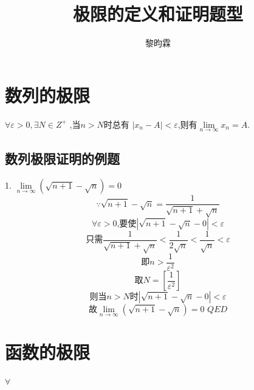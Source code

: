 \documentclass[cn,hazy,blue,14pt,screen]{elegantnote}
\title{极限的定义和证明题型}
\author{黎昀霖}
\begin{document}
\maketitle

\section{数列的极限}

$\forall \varepsilon>0, \exists N\in Z^{+}$ ,当$n>N$时总有 $| x_{n} - A |< \varepsilon$,则有$\lim\limits_{n \to \infty} x_n = A$.

\subsection{数列极限证明的例题}
1. $ \lim\limits_{n \to \infty} (\sqrt{n+1}-\sqrt{n}) =0 $
$$ \because \sqrt{n+1} - \sqrt{n} = \frac{1}{\sqrt{n+1} + \sqrt{n}}  $$
$$\forall \varepsilon >0 \text{,要使} |\sqrt{n+1} - \sqrt{n} -0 | < \varepsilon $$
$$\text{只需} \frac{1}{\sqrt{n+1} + \sqrt{n}} < \frac{1}{2\sqrt{n}} < \frac{1}{\sqrt{n}} < \varepsilon$$
$$\text{即} n>\frac{1}{\varepsilon^{2}} $$
$$\text{取} N=[\frac{1}{\varepsilon^{2}}]$$
$$\text{则当} n>N\text{时} |\sqrt{n+1} - \sqrt{n} -0 | < \varepsilon$$
$$\text{故} \lim\limits_{n \to \infty} (\sqrt{n+1} - \sqrt{n}) = 0 \,\,QED$$

\section{函数的极限}

$ \forall $
\end{document}
